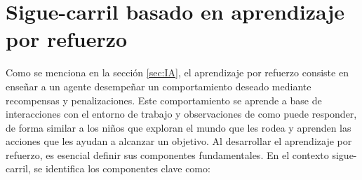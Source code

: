   \section{Sigue-carril basado en aprendizaje por refuerzo}
  \label{sec:aprendizaje por refuerzo}

  Como se menciona en la sección \ref{sec:IA}, el aprendizaje por refuerzo consiste en enseñar a un agente 
  desempeñar un comportamiento deseado mediante recompensas y penalizaciones. Este comportamiento se aprende a base de interacciones con el entorno de trabajo y observaciones de como puede responder,
  de forma similar a los niños que exploran el mundo que les rodea y aprenden las acciones que les ayudan a alcanzar un objetivo. Al desarrollar el aprendizaje por refuerzo, es esencial 
  definir sus componentes fundamentales. En el contexto sigue-carril, se identifica los componentes clave como: 
